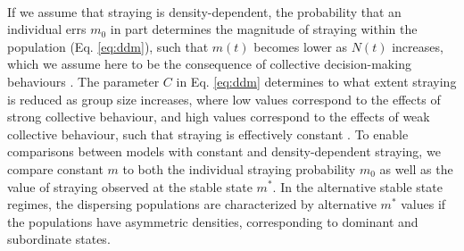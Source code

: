 \documentclass{revtex4}
\begin{document}
 \\
If we assume that straying is density-dependent, the probability that an individual errs $m_0$ in part determines the magnitude of straying within the population (Eq. \ref{eq:ddm}), such that $m(t)$ becomes lower as $N(t)$ increases, which we assume here to be the consequence of collective decision-making behaviours \citep{Berdahl:2016dx}.
The parameter $C$ in Eq. \ref{eq:ddm} determines to what extent straying is reduced as group size increases, where low values correspond to the effects of strong collective behaviour, and high values correspond to the effects of weak collective behaviour, such that straying is effectively constant \citep{Berdahl:2016dx}.
To enable comparisons between models with constant and density-dependent straying, we compare constant $m$ to both the individual straying probability $m_0$ as well as the value of straying observed at the stable state $m^*$.
In the alternative stable state regimes, the dispersing populations are characterized by alternative $m^*$ values if the populations have asymmetric densities, corresponding to dominant and subordinate states.
\end{document}
